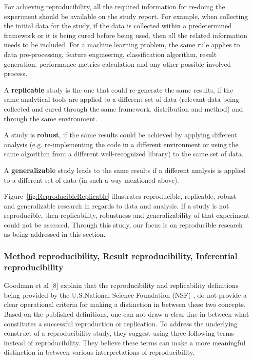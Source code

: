 For achieving reproducibility, all the required information for re-doing the experiment should be available on the 
study report. For example, when collecting the initial data for the study, if the data is collected within a predetermined 
framework or it is being cured before being used, then all the related information needs to be included. For a machine learning 
problem, the same rule applies to data pre-processing, feature engineering, classification algorithm, result generation, 
performance metrics calculation and any other possible involved process.

A \textbf{replicable} study is the one that could re-generate the same results, if the same analytical tools are applied to a 
different set of data (relevant data being collected and cured through the same framework, distribution and method) and 
through the same environment.

A study is \textbf{robust}, if the same results could be achieved by applying different analysis (e.g. re-implementing the code 
in a different environment or using the same algorithm from a different well-recognized library) to the same set of data.

A \textbf{generalizable} study leads to the same results if a different analysis is applied to a different set of data 
(in such a way mentioned above). 

Figure~\ref{fig:ReproducibleReplicable} illustrates reproducible, replicable, robust and generalizable research in regards 
to data and analysis. If a study is not reproducible, then replicability, robustness and generalizability of that experiment 
could not be assessed. Through this study, our focus is on reproducible research as being addressed in this section.

\subsubsection{Method reproducibility, Result reproducibility, Inferential reproducibility}
Goodman et al [8] explain that the reproducibility and replicability definitions being provided by the U.S.National 
Science Foundation (NSF) \cite{cacioppo_social_2015}, do not provide a clear operational criteria for making a distinction 
in between these two concepts. Based on the published definitions, one can not draw a clear line in between what constitutes 
a successful reproduction or replication. To address the underlying construct of a reproducibility study, they suggest using 
three following terms instead of reproducibility. They believe these terms can make a more meaningful distinction in between 
various interpretations of reproducibility.

